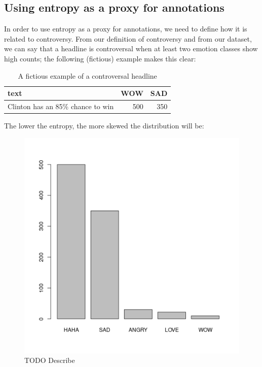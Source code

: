 \documentclass[article,11pt,nofixltx2e]{article}
\begin{document}
\subsection{Using entropy as a proxy for annotations}
\label{sec-2-4}

In order to use entropy as a proxy for annotations, we need to define how it is related to controversy. From our definition of controversy and from our dataset, we can say that a headline is controversal when at least two emotion classes show high counts; the following (fictious) example makes this clear:

\begin{table}[htb]
\caption{\label{tab:example-controvery}A fictious example of a controversal headline}
\centering
\begin{tabular}{lrr}
text & WOW & SAD\\
\hline
Clinton has an 85\% chance to win & 500 & 350\\
\end{tabular}
\end{table}

The lower the entropy, the more skewed the distribution will be:


\begin{figure}[htb]
\centering
\includegraphics[width=.9\linewidth]{./img/a1barplot1.png}
\caption{\label{fig:bar-plot}TODO Describe}
\end{figure}
\end{document}
